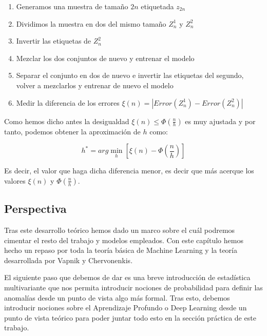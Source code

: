 \begin{enumerate}
	\item Generamos una muestra de tamaño $2n$ etiquetada $z_{2n}$
	\item Dividimos la muestra en dos del mismo tamaño $Z_n^1$ y $Z_n^2$
	\item Invertir las etiquetas de $Z_n^2$
	\item Mezclar los dos conjuntos de nuevo y entrenar el modelo
	\item Separar el conjunto en dos de nuevo e invertir las etiquetas del segundo, volver a mezclarlos y entrenar de nuevo el modelo
	\item Medir  la diferencia de los errores $\xi (n) = |Error(Z_n^1) - Error(Z_n^2)|$
\end{enumerate}

Como hemos dicho antes la desigualdad $\xi (n) \leq \Phi (\frac{n}{h})$ es muy ajustada y por tanto, podemos obtener la aproximación de $h$ como:

$$h^* = arg \min_{h} [\xi (n) - \Phi (\frac{n}{h})]$$

Es decir, el valor que haga dicha diferencia menor, es decir que más acerque los valores $\xi (n)$ y $\Phi (\frac{n}{h})$.

\subsection{Perspectiva}

Tras este desarrollo teórico hemos dado un marco sobre el cuál podremos cimentar el resto del trabajo y modelos empleados. Con este capítulo hemos hecho un repaso por toda la teoría básica de Machine Learning y la teoría desarrollada por Vapnik y Chervonenkis.

El siguiente paso que debemos de dar es una breve introducción de estadística multivariante que nos permita introducir nociones de probabilidad para definir las anomalías desde un punto de vista algo más formal. Tras esto, debemos introducir nociones sobre el Aprendizaje Profundo o Deep Learning desde un punto de vista teórico para poder juntar todo esto en la sección práctica de este trabajo.